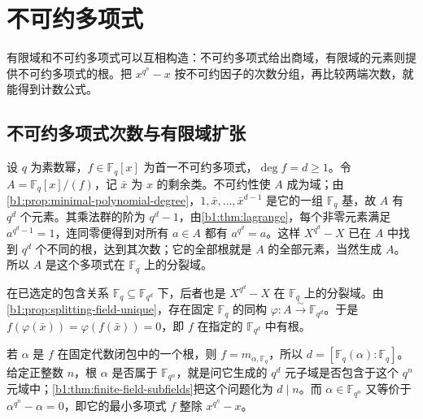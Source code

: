 
\section{不可约多项式}
\label{b1:sec:1703}

%
%

有限域和不可约多项式可以互相构造：不可约多项式给出商域，有限域的元素则提供不可约多项式的根。把 \(x^{q^n}-x\) 按不可约因子的次数分组，再比较两端次数，就能得到计数公式。

\subsection{不可约多项式次数与有限域扩张}
\label{b1:subsec:1703:01}

设 \(q\) 为素数幂，\(f\in\mathbb F_q[x]\) 为首一不可约多项式，\(\deg f=d\geq1\)。令 \(A=\mathbb F_q[x]/(f)\)，记 \(\bar x\) 为 \(x\) 的剩余类。不可约性使 \(A\) 成为域；由\cref{b1:prop:minimal-polynomial-degree}，\(1,\bar x,\ldots,\bar x^{d-1}\) 是它的一组 \(\mathbb F_q\) 基，故 \(A\) 有 \(q^d\) 个元素。其乘法群的阶为 \(q^d-1\)，由\cref{b1:thm:lagrange}，每个非零元素满足 \(a^{q^d-1}=1\)，连同零便得到对所有 \(a\in A\) 都有 \(a^{q^d}=a\)。这样 \(X^{q^d}-X\) 已在 \(A\) 中找到 \(q^d\) 个不同的根，达到其次数；它的全部根就是 \(A\) 的全部元素，当然生成 \(A\)。所以 \(A\) 是这个多项式在 \(\mathbb F_q\) 上的分裂域。

\ProseParagraphBreak
在已选定的包含关系 \(\mathbb F_q\subseteq\mathbb F_{q^d}\) 下，后者也是 \(X^{q^d}-X\) 在 \(\mathbb F_q\) 上的分裂域。由\cref{b1:prop:splitting-field-unique}，存在固定 \(\mathbb F_q\) 的同构 \(\varphi:A\xrightarrow{\sim}\mathbb F_{q^d}\)。于是 \(f(\varphi(\bar x))=\varphi(f(\bar x))=0\)，即 \(f\) 在指定的 \(\mathbb F_{q^d}\) 中有根。

\ProseParagraphBreak
若 \(\alpha\) 是 \(f\) 在固定代数闭包中的一个根，则 \(f=m_{\alpha,\mathbb F_q}\)，所以 \(d=[\mathbb F_q(\alpha):\mathbb F_q]\)。给定正整数 \(n\)，根 \(\alpha\) 是否属于 \(\mathbb F_{q^n}\)，就是问它生成的 \(q^d\) 元子域是否包含于这个 \(q^n\) 元域中；\cref{b1:thm:finite-field-subfields}把这个问题化为 \(d\mid n\)。而 \(\alpha\in\mathbb F_{q^n}\) 又等价于 \(\alpha^{q^n}-\alpha=0\)，即它的最小多项式 \(f\) 整除 \(x^{q^n}-x\)。

